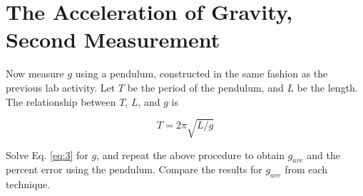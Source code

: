 \documentclass{article}
\begin{document}
\section{The Acceleration of Gravity, Second Measurement}

Now measure $g$ using a pendulum, constructed in the same fashion as the previous lab activity.  Let $T$ be the period of the pendulum, and $L$ be the length.  The relationship between $T$, $L$, and $g$ is

\begin{equation}
T = 2\pi \sqrt{L/g} \label{eq:3}
\end{equation}

Solve Eq. \ref{eq:3} for $g$, and repeat the above procedure to obtain $g_{ave}$ and the percent error using the pendulum.  Compare the results for $g_{ave}$ from each technique.
\end{document}
